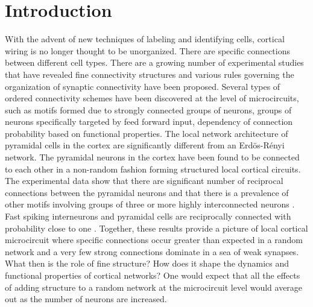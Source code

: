 \section{Introduction}
With the advent of new techniques of labeling and identifying cells, cortical wiring is no longer thought to be unorganized. There are specific connections between different cell types. There are a growing number of experimental studies that have revealed fine connectivity structures and various rules governing the organization of synaptic connectivity have been proposed. Several types of ordered connectivity schemes have been discovered at the level of microcircuits, such as motifs formed due to strongly connected groups of neurons, groups of neurons specifically targeted by feed forward input, dependency of connection probability based on functional properties. The local network architecture of pyramidal cells in the cortex are significantly different from an Erdös-Rényi network. The pyramidal neurons in the cortex have been found to be connected to each other in a non-random fashion forming structured local cortical circuits. The experimental data show that there are significant number of reciprocal connections between the pyramidal neurons and that there is a prevalence of other motifs involving groups of three or more highly interconnected neurons \cite{markram1997,thomson2002, Song2005, Perin2011}. Fast spiking interneurons and pyramidal cells are reciprocally connected with probability close to one \cite{Yoshimura2005}. Together, these results provide a picture of local cortical microcircuit where specific connections occur greater than expected in a random network and a very few strong connections dominate in a sea of weak synapses. What then is the role of fine structure? How does it shape the dynamics and functional properties of cortical networks? One would expect that all the effects of adding structure to a random network at the microcircuit level would average out as the number of neurons are increased.  


